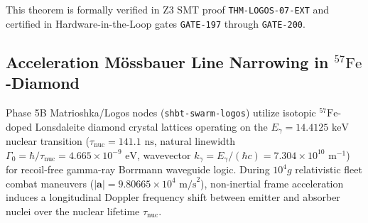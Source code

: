 \documentclass[11pt,onecolumn]{article}
\begin{document}
This theorem is formally verified in Z3 SMT proof \texttt{THM-LOGOS-07-EXT} and certified in Hardware-in-the-Loop gates \texttt{GATE-197} through \texttt{GATE-200}.

\FloatBarrier
\FloatBarrier
\subsection{Acceleration M\"ossbauer Line Narrowing in \texorpdfstring{$^{57}\mathrm{Fe}$-Diamond}{57Fe-Diamond Computronium}}
\label{sec:acceleration_mossbauer}

Phase 5B Matrioshka/Logos nodes (\texttt{shbt-swarm-logos}) utilize isotopic ${}^{57}\mathrm{Fe}$-doped Lonsdaleite diamond crystal lattices operating on the $E_\gamma = 14.4125\text{ keV}$ nuclear transition ($\tau_{\mathrm{nuc}} = 141.1\text{ ns}$, natural linewidth $\Gamma_0 = \hbar / \tau_{\mathrm{nuc}} = 4.665 \times 10^{-9}\text{ eV}$, wavevector $k_\gamma = E_\gamma / (\hbar c) = 7.304 \times 10^{10}\text{ m}^{-1}$) for recoil-free gamma-ray Borrmann waveguide logic. During $10^4g$ relativistic fleet combat maneuvers ($|\mathbf{a}| = 9.80665 \times 10^4\text{ m/s}^2$), non-inertial frame acceleration induces a longitudinal Doppler frequency shift between emitter and absorber nuclei over the nuclear lifetime $\tau_{\mathrm{nuc}}$.
\end{document}

